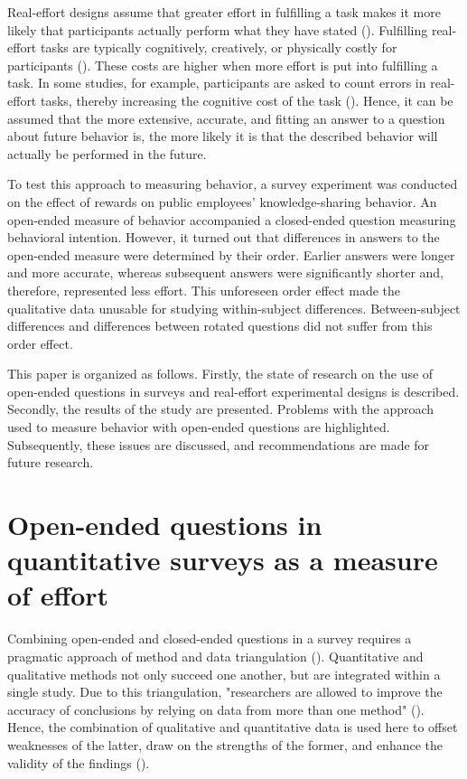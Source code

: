 \documentclass[twocolumn, serif, empirical, authordate]{jote-article}
\begin{document}
Real-effort designs assume that greater effort in fulfilling a task makes it more likely that participants actually perform what they have stated (). Fulfilling real-effort tasks are typically cognitively, creatively, or physically costly for participants (). These costs are higher when more effort is put into fulfilling a task. In some studies, for example, participants are asked to count errors in real-effort tasks, thereby increasing the cognitive cost of the task (). Hence, it can be assumed that the more extensive, accurate, and fitting an answer to a question about future behavior is, the more likely it is that the described behavior will actually be performed in the future.

To test this approach to measuring behavior, a survey experiment was conducted on the effect of rewards on public employees' knowledge-sharing behavior. An open-ended measure of behavior accompanied a closed-ended question measuring behavioral intention.
However, it turned out that differences in answers to the open-ended measure were determined by their order. Earlier answers were longer and more accurate, whereas subsequent answers were significantly shorter and, therefore, represented less effort. This unforeseen order effect made the qualitative data unusable for studying within-subject differences. Between-subject differences and differences between rotated questions did not suffer from this order effect.

This paper is organized as follows. Firstly, the state of research on the use of open-ended questions in surveys and real-effort experimental designs is described. Secondly, the results of the study are presented.
Problems with the approach used to measure behavior with open-ended questions are highlighted. Subsequently, these issues are discussed, and recommendations are made for future research.


\section*{Open-ended questions in quantitative surveys as a measure of effort}

Combining open-ended and closed-ended questions in a survey requires a pragmatic approach of method and data triangulation (). Quantitative and qualitative methods not only succeed one another, but are integrated within a single study. Due to this triangulation, "researchers are allowed to improve the accuracy of conclusions by relying on data from more than one method" (). Hence, the combination of qualitative and quantitative data is used here to offset weaknesses of the latter, draw on the strengths of the former, and enhance the validity of the findings ().
\end{document}
